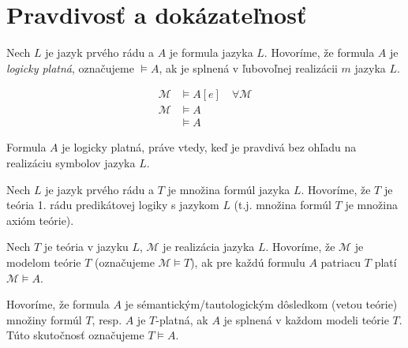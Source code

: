 \section{Pravdivosť a dokázateľnosť}

\begin{definicia}
    Nech $L$ je jazyk prvého rádu a $A$ je formula jazyka
    $L$. Hovoríme, že formula $A$ je \emph{logicky platná},
    označujeme $\models A$,
    ak je splnená v ľubovoľnej realizácii $m$ jazyka $L$.

    \begin{align*}
        \mathcal{M} & \models A[e] \quad \forall \mathcal{M} \\
        \mathcal{M} & \models A \\
        & \models A
    \end{align*}
\end{definicia}

\begin{poznamka}
    Formula $A$ je logicky platná, práve vtedy, keď je pravdivá
    bez ohľadu na realizáciu symbolov jazyka $L$.
\end{poznamka}

\begin{definicia}[Teória]
    Nech $L$ je jazyk prvého rádu a $T$ je množina formúl
    jazyka $L$. Hovoríme, že $T$ je teória 1. rádu predikátovej logiky
    s jazykom $L$ (t.j. množina formúl $T$ je množina axióm teórie).
\end{definicia}

\begin{definicia}
    Nech $T$ je teória v jazyku $L$, $\mathcal{M}$ je realizácia jazyka $L$.
    Hovoríme, že $\mathcal{M}$ je modelom teórie $T$ (označujeme
    $\mathcal{M} \models T$), ak pre každú formulu $A$
    patriacu $T$ platí $\mathcal{M} \models A$.
\end{definicia}

\begin{definicia}
    Hovoríme, že formula $A$ je
    sémantickým/tautologickým dôsledkom (vetou teórie) množiny formúl $T$,
    resp. $A$ je $T$-platná, ak $A$ je splnená v každom modeli teórie $T$.
    Túto skutočnosť označujeme $T \models A$.
\end{definicia}

